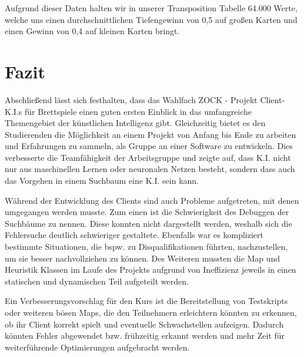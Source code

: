 \documentclass[12pt,a4paper,bibliography=totocnumbered,listof=totocnumbered]{article}
\begin{document}
Aufgrund dieser Daten halten wir in unserer Transposition Tabelle 64.000 Werte, welche uns einen durchschnittlichen Tiefengewinn von 0,5 auf großen Karten und einen Gewinn von 0,4 auf kleinen Karten bringt.

\newpage
\section{Fazit}
Abschließend lässt sich festhalten, dass das Wahlfach \glqq ZOCK - Projekt Client-K.I.s für Brettspiele\grqq{} einen guten ersten Einblick in das umfangreiche Themengebiet der künstlichen Intelligenz gibt. Gleichzeitig bietet es den Studierenden die Möglichkeit an einem Projekt von Anfang bis Ende zu arbeiten und Erfahrungen zu sammeln, als Gruppe an einer Software zu entwickeln. Dies verbesserte die Teamfähigkeit der Arbeitsgruppe und zeigte auf, dass K.I. nicht nur aus maschinellen Lernen oder neuronalen Netzen besteht, sondern dass auch das Vorgehen in einem Suchbaum eine K.I. sein kann.

Während der Entwicklung des Clients sind auch Probleme aufgetreten, mit denen umgegangen werden musste. Zum einen ist die Schwierigkeit des Debuggen der Suchbäume zu nennen. Diese konnten nicht dargestellt werden, weshalb sich die Fehlersuche deutlich schwieriger gestaltete. Ebenfalls war es kompliziert bestimmte Situationen, die bspw. zu Disqualifikationen führten, nachzustellen, um sie besser nachvollziehen zu können. Des Weiteren mussten die Map und Heuristik Klassen im Laufe des Projekts aufgrund von Ineffizienz jeweils in einen statischen und dynamischen Teil aufgeteilt werden.

Ein Verbesserungsvorschlag für den Kurs ist die Bereitstellung von Testskripts oder weiteren \glqq bösen\grqq{} Maps, die den Teilnehmern erleichtern könnten zu erkennen, ob ihr Client korrekt spielt und eventuelle Schwachstellen aufzeigen. Dadurch könnten Fehler abgewendet bzw. frühzeitig erkannt werden und mehr Zeit für weiterführende Optimierungen aufgebracht werden.

\newpage
\renewcommand\refname{Quellenverzeichnis}


\pagebreak
\end{document}

